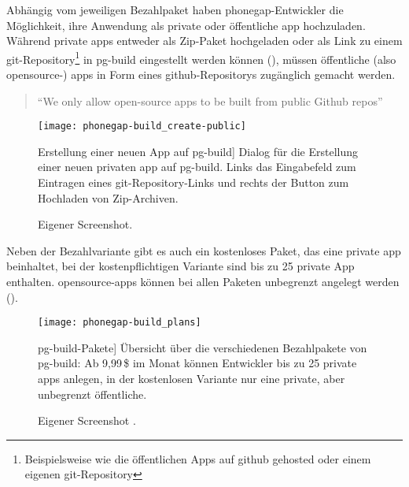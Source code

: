 {Abhängig vom jeweiligen Bezahlpaket haben \gls{phonegap}-Entwickler die Möglichkeit, ihre Anwendung als private oder öffentliche \gls{app} hochzuladen. 
Während private \glspl{app} entweder als Zip-Paket hochgeladen oder als Link zu einem \gls{git}-Repository\footnote{Beispielsweise wie die öffentlichen Apps auf \gls{github} gehosted oder einem eigenen \gls{git}-Repository} in \gls{pg-build} eingestellt werden können (), müssen öffentliche (also \gls{opensource}-) \glspl{app} in Form eines \gls{github}-Repositorys zugänglich gemacht werden.

\begin{quote}
\enquote{We only allow open-source apps to be built from public Github repos} \cite{PhoneGap_Build_Apps}
\end{quote}


\begin{figure}[h!]
\centering
\texttt{[image: phonegap-build\_create-public]}
	\caption
		[Erstellung einer neuen App auf \gls{pg-build}]
		{Dialog für die Erstellung einer neuen privaten \gls{app} auf \gls{pg-build}. Links das Eingabefeld zum Eintragen eines \gls{git}-Repository-Links und rechts der Button zum Hochladen von Zip-Archiven.}
		\label{fig:phonegap-build_create-public}
	\imagesourcefont
	\vspace{\imagesourcespace}
	\imagesourcefont{}
	\caption*{\imagesourcelabel Eigener Screenshot.}
\end{figure}


Neben der Bezahlvariante gibt es auch ein kostenloses Paket, das eine private \gls{app} beinhaltet, bei der kostenpflichtigen Variante sind bis zu 25 private App enthalten.
\gls{opensource}-\glspl{app} können bei allen Paketen unbegrenzt angelegt werden ().

\begin{figure}[h!]
\centering
\texttt{[image: phonegap-build\_plans]}
	\caption
		[\gls{pg-build}-Pakete]
		{Übersicht über die verschiedenen Bezahlpakete von \gls{pg-build}: Ab 9,99\,\$ im Monat können Entwickler bis zu 25 private \glspl{app} anlegen, in der kostenlosen Variante nur eine private, aber unbegrenzt öffentliche.}
		\label{fig:phonegap-build_plans}
	\imagesourcefont
	\vspace{\imagesourcespace}
	\imagesourcefont{}
	\caption*{\imagesourcelabel Eigener Screenshot \cite{Adobe_PhoneGap_Build_Plans}.}
\end{figure}


}
